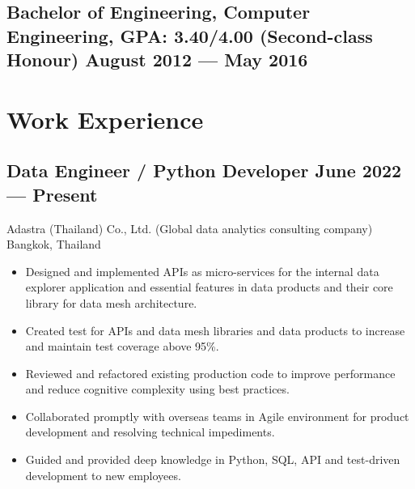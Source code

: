 \documentclass{article}
\newcommand{\subtext}[1]{
#1\par\vspace{-0.2cm}}
\newenvironment{zitemize}{
\begin{itemize}\itemsep0pt \parskip0pt \parsep1pt}
{\end{itemize}\vspace{-0.5cm}}
\begin{document}
        \subsection*{Bachelor of Engineering, Computer Engineering, {\normalsize \normalfont GPA: 3.40/4.00 \small{(Second-class Honour)}} \hfill August 2012 --- May 2016} 
        \vspace{0.1cm}

    \section{Work Experience}
    \vspace{-0.1cm}

        \subsection*{Data Engineer / Python Developer \hfill June 2022 --- Present} 
        \subtext{Adastra (Thailand) Co., Ltd. {\scriptsize (Global data analytics consulting company)} \hfill Bangkok, Thailand} 
            \vspace{0.05cm}
            \begin{zitemize}
                \item Designed and implemented APIs as micro-services for the internal data explorer application and essential features in data products and their core library for data mesh architecture.
                \item Created test for APIs and data mesh libraries and data products to increase and maintain test coverage above 95\%.
                \item Reviewed and refactored existing production code to improve performance and reduce cognitive complexity using best practices.
                \item Collaborated promptly with overseas teams in Agile environment for product development and resolving technical impediments.
                \item Guided and provided deep knowledge in Python, SQL, API and test-driven development to new employees.
            \end{zitemize}
        \vspace{0.2cm}
    
\end{document}

